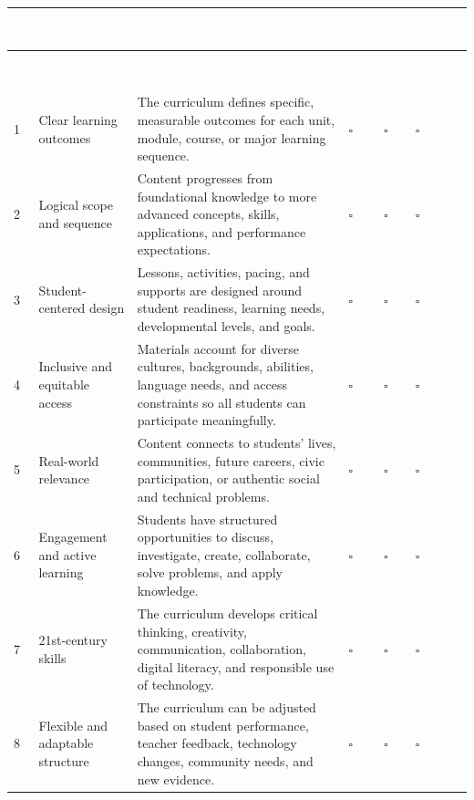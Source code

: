 \documentclass[11pt]{article}
\newcommand{\checkbox}{\(\square\)}
\begin{document}
\footnotesize
{}
\setlength{\tabcolsep}{2pt}
\begin{longtable}{L{0.25in} L{1.50in} L{3.10in} C{0.45in} C{0.45in} C{0.58in}}
\textcolor{white}{\#} & \textcolor{white}{Checklist Item} & \textcolor{white}{Minimum Standard / Evidence to Verify} & \textcolor{white}{Yes} & \textcolor{white}{No} & \textcolor{white}{Needs Work} \\
\endfirsthead
{}
\textcolor{white}{\#} & \textcolor{white}{Checklist Item} & \textcolor{white}{Minimum Standard / Evidence to Verify} & \textcolor{white}{Yes} & \textcolor{white}{No} & \textcolor{white}{Needs Work} \\
 & Clear learning outcomes & The curriculum defines specific, measurable outcomes for each unit, module, course, or major learning sequence. & \checkbox & \checkbox & \checkbox \\
2 & Logical scope and sequence & Content progresses from foundational knowledge to more advanced concepts, skills, applications, and performance expectations. & \checkbox & \checkbox & \checkbox \\
3 & Student-centered design & Lessons, activities, pacing, and supports are designed around student readiness, learning needs, developmental levels, and goals. & \checkbox & \checkbox & \checkbox \\
4 & Inclusive and equitable access & Materials account for diverse cultures, backgrounds, abilities, language needs, and access constraints so all students can participate meaningfully. & \checkbox & \checkbox & \checkbox \\
5 & Real-world relevance & Content connects to students' lives, communities, future careers, civic participation, or authentic social and technical problems. & \checkbox & \checkbox & \checkbox \\
6 & Engagement and active learning & Students have structured opportunities to discuss, investigate, create, collaborate, solve problems, and apply knowledge. & \checkbox & \checkbox & \checkbox \\
7 & 21st-century skills & The curriculum develops critical thinking, creativity, communication, collaboration, digital literacy, and responsible use of technology. & \checkbox & \checkbox & \checkbox \\
8 & Flexible and adaptable structure & The curriculum can be adjusted based on student performance, teacher feedback, technology changes, community needs, and new evidence. & \checkbox & \checkbox & \checkbox \\

\end{longtable}
\end{document}
